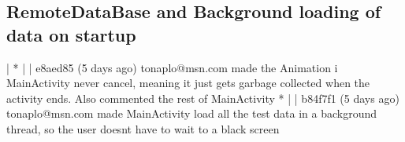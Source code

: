 \subsection{RemoteDataBase and Background loading of data on startup}
| * | | e8aed85 (5 days ago) tonaplo@msn.com made the Animation i MainActivity never cancel, meaning it just gets garbage collected when the activity ends. Also commented the rest of MainActivity
* | | b84f7f1 (5 days ago) tonaplo@msn.com made MainActivity load all the test data in a background thread, so the user doesnt have to wait to a black screen